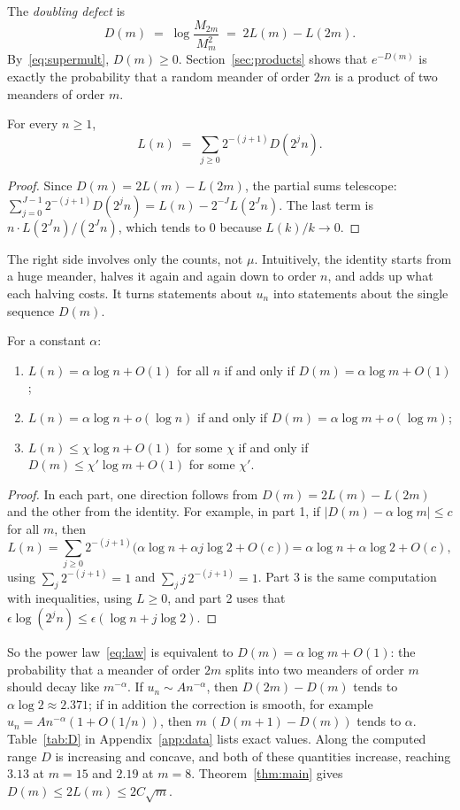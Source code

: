 The \emph{doubling defect} is
\[ D(m)\;=\;\log\frac{M_{2m}}{M_m^2}\;=\;2L(m)-L(2m) . \]
By~\eqref{eq:supermult}, $D(m)\ge0$. Section~\ref{sec:products} shows that $e^{-D(m)}$ is exactly
the probability that a random meander of order $2m$ is a product of two meanders of order $m$.

\begin{proposition}\label{prop:halving}
For every $n\ge1$,
\[ L(n)\;=\;\sum_{j\ge0}2^{-(j+1)}D(2^jn). \]
\end{proposition}

\begin{proof}
Since $D(m)=2L(m)-L(2m)$, the partial sums telescope:
$\sum_{j=0}^{J-1}2^{-(j+1)}D(2^jn)=L(n)-2^{-J}L(2^Jn)$. The last term is
$n\cdot L(2^Jn)/(2^Jn)$, which tends to $0$ because $L(k)/k\to0$.
\end{proof}

The right side involves only the counts, not $\mu$. Intuitively, the identity starts from a huge
meander, halves it again and again down to order $n$, and adds up what each halving costs. It turns statements about $u_n$ into
statements about the single sequence $D(m)$.

\begin{corollary}\label{cor:halving}
For a constant $\alpha$:
\begin{enumerate}
\item $L(n)=\alpha\log n+O(1)$ for all $n$ if and only if $D(m)=\alpha\log m+O(1)$;
\item $L(n)=\alpha\log n+o(\log n)$ if and only if $D(m)=\alpha\log m+o(\log m)$;
\item $L(n)\le\chi\log n+O(1)$ for some $\chi$ if and only if $D(m)\le\chi'\log m+O(1)$ for some $\chi'$.
\end{enumerate}
\end{corollary}

\begin{proof}
In each part, one direction follows from $D(m)=2L(m)-L(2m)$ and the other from the identity. For
example, in part 1, if $|D(m)-\alpha\log m|\le c$ for all $m$, then
\[ L(n)=\sum_{j\ge0}2^{-(j+1)}\big(\alpha\log n+\alpha j\log 2+O(c)\big)
 =\alpha\log n+\alpha\log2+O(c), \]
using $\sum_j 2^{-(j+1)}=1$ and $\sum_j j\,2^{-(j+1)}=1$. Part 3 is the same computation with inequalities, using $L\ge0$, and part 2 uses that $\epsilon\log(2^jn)\le\epsilon(\log n+j\log2)$.
\end{proof}

So the power law~\eqref{eq:law} is equivalent to $D(m)=\alpha\log m+O(1)$: the probability that a
meander of order $2m$ splits into two meanders of order $m$ should decay like $m^{-\alpha}$. If $u_n\sim An^{-\alpha}$,
then $D(2m)-D(m)$ tends to $\alpha\log 2\approx2.371$; if in addition the correction is smooth, for example
$u_n=An^{-\alpha}(1+O(1/n))$, then $m\,(D(m+1)-D(m))$ tends to $\alpha$.
Table~\ref{tab:D} in Appendix~\ref{app:data} lists exact values. Along the computed range $D$ is
increasing and concave, and both of these quantities increase, reaching $3.13$ at $m=15$ and $2.19$
at $m=8$. Theorem~\ref{thm:main} gives $D(m)\le 2L(m)\le 2C\sqrt m$.
